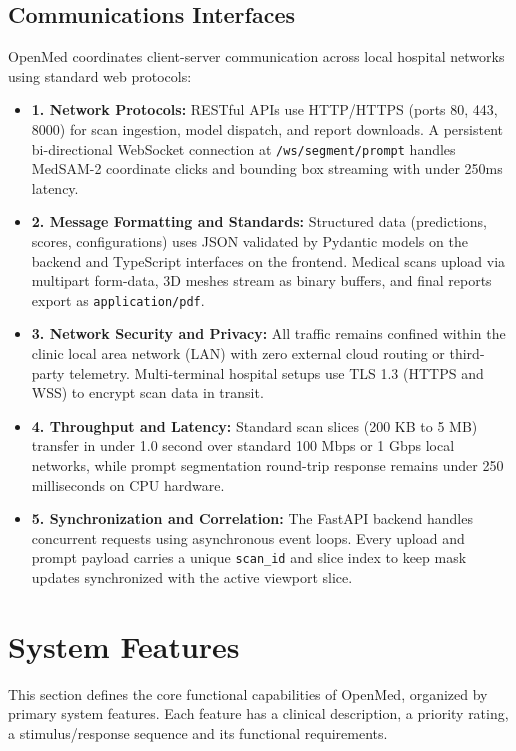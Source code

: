 \documentclass[12pt,a4paper]{report}
\begin{document}
\subsection{Communications Interfaces}
OpenMed coordinates client-server communication across local hospital networks using standard web protocols:

\begin{itemize}[leftmargin=1.2em]
    \item \textbf{1. Network Protocols:} RESTful APIs use HTTP/HTTPS (ports 80, 443, 8000) for scan ingestion, model dispatch, and report downloads. A persistent bi-directional WebSocket connection at \texttt{/ws/segment/prompt} handles MedSAM-2 coordinate clicks and bounding box streaming with under 250ms latency.
    \item \textbf{2. Message Formatting and Standards:} Structured data (predictions, scores, configurations) uses JSON validated by Pydantic models on the backend and TypeScript interfaces on the frontend. Medical scans upload via multipart form-data, 3D meshes stream as binary buffers, and final reports export as \texttt{application/pdf}.
    \item \textbf{3. Network Security and Privacy:} All traffic remains confined within the clinic local area network (LAN) with zero external cloud routing or third-party telemetry. Multi-terminal hospital setups use TLS 1.3 (HTTPS and WSS) to encrypt scan data in transit.
    \item \textbf{4. Throughput and Latency:} Standard scan slices (200 KB to 5 MB) transfer in under 1.0 second over standard 100 Mbps or 1 Gbps local networks, while prompt segmentation round-trip response remains under 250 milliseconds on CPU hardware.
    \item \textbf{5. Synchronization and Correlation:} The FastAPI backend handles concurrent requests using asynchronous event loops. Every upload and prompt payload carries a unique \texttt{scan\_id} and slice index to keep mask updates synchronized with the active viewport slice.
\end{itemize}

\section{System Features}
This section defines the core functional capabilities of OpenMed, organized by primary system features. Each feature has a clinical description, a priority rating, a stimulus/response sequence and its functional requirements.
\end{document}
